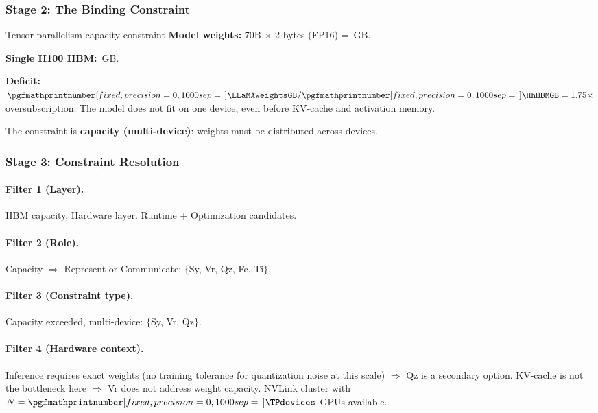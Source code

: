 \documentclass[10pt,twocolumn]{article}
\newcommand{\cvalint}[1]{\pgfmathprintnumber[fixed, precision=0, 1000 sep={\,}]{#1}}
\begin{document}
\subsubsection{Stage 2: The Binding Constraint}

\begin{napkinmath}{Tensor parallelism capacity constraint}
\textbf{Model weights:} 70B $\times$ 2 bytes (FP16) = \cvalint{\LLaMAWeightsGB}\,GB.

\textbf{Single H100 HBM:} \cvalint{\HhHBMGB}\,GB.

\textbf{Deficit:} $\cvalint{\LLaMAWeightsGB} / \cvalint{\HhHBMGB} = 1.75\times$ oversubscription. The model does not fit on one device, even before KV-cache and activation memory.

The constraint is \textbf{capacity (multi-device)}: weights must be distributed across devices.
\end{napkinmath}

\subsubsection{Stage 3: Constraint Resolution}

\paragraph{Filter 1 (Layer).} HBM capacity, Hardware layer. Runtime + Optimization candidates.

\paragraph{Filter 2 (Role).} Capacity $\Rightarrow$ Represent or Communicate: $\{$Sy, Vr, Qz, Fc, Ti$\}$.

\paragraph{Filter 3 (Constraint type).} Capacity exceeded, multi-device: $\{$Sy, Vr, Qz$\}$.

\paragraph{Filter 4 (Hardware context).} Inference requires exact weights (no training tolerance for quantization noise at this scale) $\Rightarrow$ Qz is a secondary option. KV-cache is not the bottleneck here $\Rightarrow$ Vr does not address weight capacity. NVLink cluster with $N = \cvalint{\TPdevices}$ GPUs available.
\end{document}
